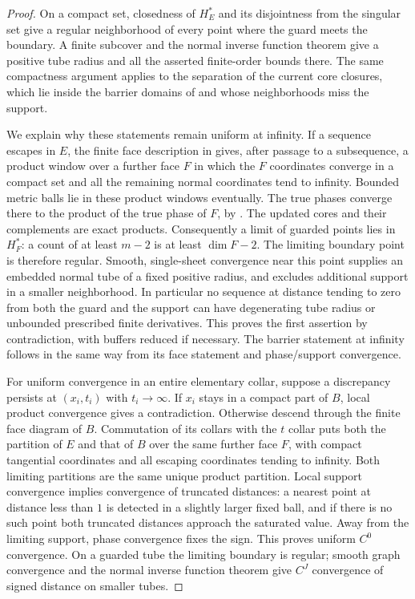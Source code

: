 \begin{proof}
On a compact set, closedness of $H_E^*$ and its disjointness from the
singular set give a regular neighborhood of every point where the guard
meets the boundary.  A finite subcover and the normal inverse function
theorem give a positive tube radius and all the asserted finite-order
bounds there.  The same compactness argument applies to the separation
of the current core closures, which lie inside the barrier domains of
 and whose neighborhoods miss the support.

We explain why these statements remain uniform at infinity.  If a
sequence escapes in $E$, the finite face description in
 gives, after passage to a subsequence, a product
window over a further face $F$ in which the $F$ coordinates converge
in a compact set and all the remaining normal coordinates tend to
infinity.  Bounded metric balls lie in these product windows eventually.
The true phases converge there to the product of the true phase of
$F$, by .  The updated cores and their
complements are exact products.  Consequently a limit of guarded points
lies in $H_F^*$: a count of at least $m-2$ is at least
$\dim F-2$.  The limiting boundary point is therefore regular.
Smooth, single-sheet convergence near this point supplies an embedded
normal tube of a fixed positive radius, and excludes additional support
in a smaller neighborhood.  In particular no sequence at distance
tending to zero from both the guard and the support can have degenerating
tube radius or unbounded prescribed finite derivatives.  This proves
the first assertion by contradiction, with buffers reduced if necessary.
The barrier statement at infinity follows in the same way from its
face statement and phase/support convergence.

For uniform convergence in an entire elementary collar, suppose a
discrepancy persists at $(x_i,t_i)$ with $t_i\to\infty$.  If $x_i$
stays in a compact part of $B$, local product convergence gives a
contradiction.  Otherwise descend through the finite face diagram of
$B$.  Commutation of its collars with the $t$ collar puts both the
partition of $E$ and that of $B$ over the same further face $F$,
with compact tangential coordinates and all escaping coordinates tending
to infinity.  Both limiting partitions are the same unique product
partition.  Local support convergence implies convergence of truncated
distances: a nearest point at distance less than $1$ is detected in a
slightly larger fixed ball, and if there is no such point both truncated
distances approach the saturated value.  Away from the limiting support,
phase convergence fixes the sign.  This proves uniform $C^0$
convergence.  On a guarded tube the limiting boundary is regular; smooth
graph convergence and the normal inverse function theorem give $C^J$
convergence of signed distance on smaller tubes.


\end{proof}
